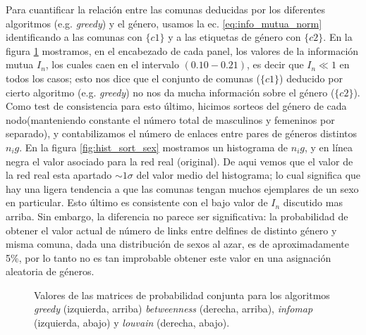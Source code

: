 Para cuantificar la relaci\'on entre las comunas deducidas por los diferentes algoritmos (e.g. {\it greedy}) y el g\'enero, usamos la ec. \ref{eq:info_mutua_norm} identificando a las comunas con $\{c1\}$ y a las etiquetas de g\'enero con $\{c2\}$.
En la figura \ref{fig:prob_conj} mostramos, en el encabezado de cada panel, los valores de la informaci\'on mutua $I_n$, los cuales caen en el intervalo $(0.10 - 0.21)$, es decir que $I_n \ll 1$ en todos los casos; esto nos dice que el conjunto de comunas ($\{c1\}$) deducido por cierto algoritmo (e.g. {\it greedy}) no nos da mucha informaci\'on sobre el g\'enero ($\{c2\}$).
Como test de consistencia para esto  \'ultimo, hicimos sorteos del g\'enero de cada nodo(manteniendo constante el n\'umero total de masculinos y femeninos por separado), y contabilizamos el n\'umero de enlaces entre pares de g\'eneros distintos $n_ig$.
En la figura \ref{fig:hist_sort_sex} mostramos un histograma de $n_ig$, y en l\'inea negra el valor asociado para la red real (original).
De aqui vemos que el valor de la red real esta apartado $\sim 1 \sigma$ del valor medio del histograma; lo cual significa que hay una ligera tendencia a que las comunas tengan muchos ejemplares de un sexo en particular. 
Esto \'ultimo es consistente con el bajo valor de $I_n$ discutido mas arriba.
Sin embargo, la diferencia no parece ser significativa: la probabilidad de obtener el valor actual de número de links entre delfines de distinto género y misma comuna, dada una distribución de sexos al azar, es de aproximadamente 5\%, por lo tanto no es tan improbable obtener este valor en una asignación aleatoria de géneros.



\begin{figure}
    \centering
    \caption{
    Valores de las matrices de probabilidad conjunta para los algoritmos {\it greedy} (izquierda, arriba) {\it betweenness} (derecha, arriba), {\it infomap} (izquierda, abajo) y {\it louvain} (derecha, abajo). 
    }
\label{fig:prob_conj}
\end{figure}


